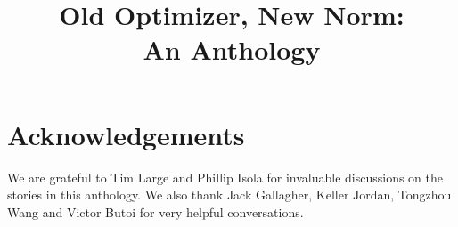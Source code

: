 \documentclass[final]{style/opt2024}
\title[Old Optimizer, New Norm: An Anthology]{Old Optimizer, New Norm:\\An Anthology}
\begin{document}
\maketitle






\clearpage


\clearpage

\clearpage


\section*{Acknowledgements}
We are grateful to Tim Large and Phillip Isola for invaluable discussions on the stories in this anthology. We also thank Jack Gallagher, Keller Jordan, Tongzhou Wang and Victor Butoi for very helpful conversations.

\clearpage


\newpage
\clearpage
\appendix


\clearpage

\end{document}
